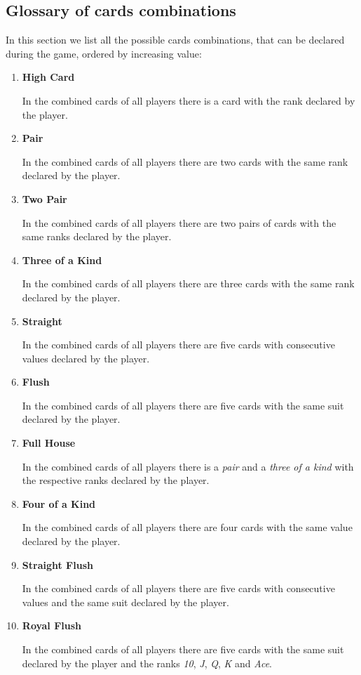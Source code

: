 \documentclass{scrartcl}
\begin{document}
\subsection{Glossary of cards combinations}\label{cards-combinations}
In this section we list all the possible cards combinations, that can be declared during the game,
ordered by increasing value:
\begin{enumerate}
      \item \textbf{High Card}\par
            In the combined cards of all players there is a card with the rank declared by the player.
      \item \textbf{Pair}\par
            In the combined cards of all players there are two cards with the same rank declared by
            the player.
      \item \textbf{Two Pair}\par
            In the combined cards of all players there are two pairs of cards with the same ranks
            declared by the player.
      \item \textbf{Three of a Kind}\par
            In the combined cards of all players there are three cards with the same rank declared by
            the player.
      \item \textbf{Straight}\par
            In the combined cards of all players there are five cards with consecutive values declared
            by the player.
      \item \textbf{Flush}\par
            In the combined cards of all players there are five cards with the same suit declared by
            the player.
      \item \textbf{Full House}\par
            In the combined cards of all players there is a \emph{pair} and a \emph{three of a kind}
            with the respective ranks declared by the player.
      \item \textbf{Four of a Kind}\par
            In the combined cards of all players there are four cards with the same value declared
            by the player.
      \item \textbf{Straight Flush}\par
            In the combined cards of all players there are five cards with consecutive values and
            the same suit declared by the player.
      \item \textbf{Royal Flush}\par
            In the combined cards of all players there are five cards with the same suit declared
            by the player and the ranks \emph{10}, \emph{J}, \emph{Q}, \emph{K} and \emph{Ace}.
\end{enumerate}
\end{document}
